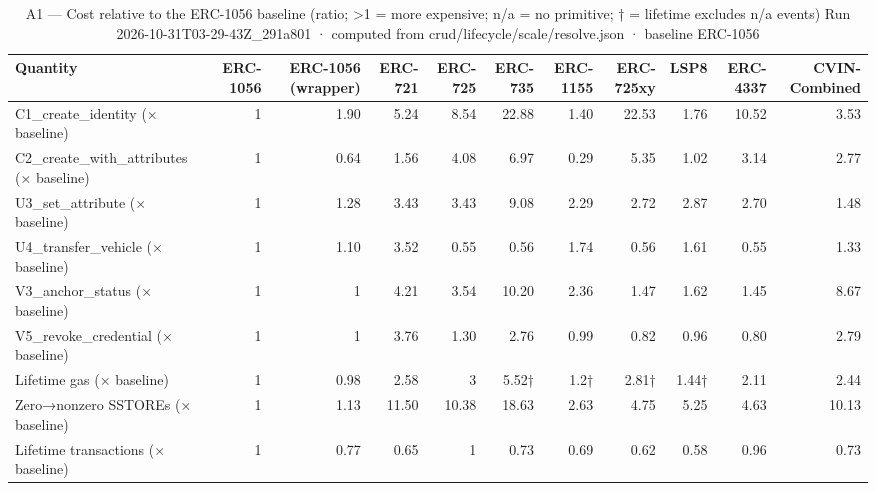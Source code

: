 \begin{table}[ht]
\centering
\small
\begin{tabular}{lrrrrrrrrrr}
\toprule
Quantity & ERC-1056 & ERC-1056 (wrapper) & ERC-721 & ERC-725 & ERC-735 & ERC-1155 & ERC-725xy & LSP8 & ERC-4337 & CVIN-Combined \\
\midrule
C1\_create\_identity (× baseline) & 1 & 1.90 & 5.24 & 8.54 & 22.88 & 1.40 & 22.53 & 1.76 & 10.52 & 3.53 \\
C2\_create\_with\_attributes (× baseline) & 1 & 0.64 & 1.56 & 4.08 & 6.97 & 0.29 & 5.35 & 1.02 & 3.14 & 2.77 \\
U3\_set\_attribute (× baseline) & 1 & 1.28 & 3.43 & 3.43 & 9.08 & 2.29 & 2.72 & 2.87 & 2.70 & 1.48 \\
U4\_transfer\_vehicle (× baseline) & 1 & 1.10 & 3.52 & 0.55 & 0.56 & 1.74 & 0.56 & 1.61 & 0.55 & 1.33 \\
V3\_anchor\_status (× baseline) & 1 & 1 & 4.21 & 3.54 & 10.20 & 2.36 & 1.47 & 1.62 & 1.45 & 8.67 \\
V5\_revoke\_credential (× baseline) & 1 & 1 & 3.76 & 1.30 & 2.76 & 0.99 & 0.82 & 0.96 & 0.80 & 2.79 \\
Lifetime gas (× baseline) & 1 & 0.98 & 2.58 & 3 & 5.52† & 1.2† & 2.81† & 1.44† & 2.11 & 2.44 \\
Zero→nonzero SSTOREs (× baseline) & 1 & 1.13 & 11.50 & 10.38 & 18.63 & 2.63 & 4.75 & 5.25 & 4.63 & 10.13 \\
Lifetime transactions (× baseline) & 1 & 0.77 & 0.65 & 1 & 0.73 & 0.69 & 0.62 & 0.58 & 0.96 & 0.73 \\
\bottomrule
\end{tabular}
\caption{A1 — Cost relative to the ERC-1056 baseline (ratio; >1 = more expensive; n/a = no primitive; † = lifetime excludes n/a events) Run 2026-10-31T03-29-43Z\_291a801 · computed from crud/lifecycle/scale/resolve.json · baseline ERC-1056}
\label{tab:analysis_ratios}
\end{table}
